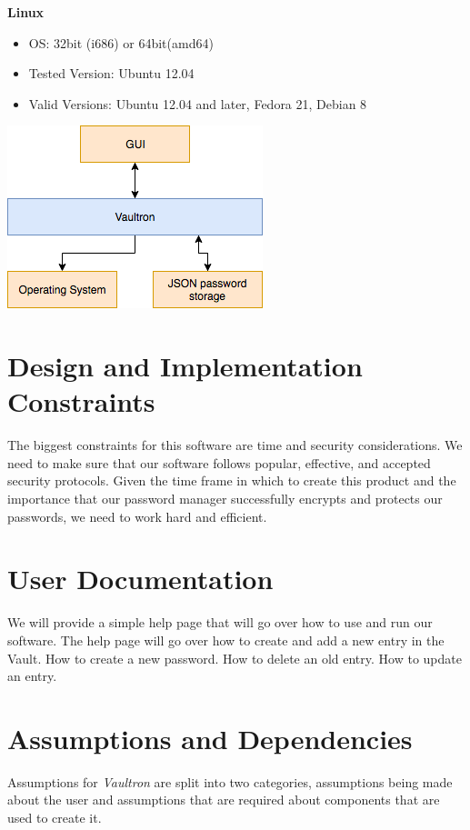 \documentclass[11pt]{report}
\newenvironment{myitemize}
{ \begin{itemize}
    \setlength{\itemsep}{0pt}
    \setlength{\parskip}{0pt}
    \setlength{\parsep}{0pt}     }
{ \end{itemize}                  }
\begin{document}
\textbf{Linux}
\begin{myitemize}
    \item OS: 32bit (i686) or 64bit(amd64)
    \item Tested Version: Ubuntu 12.04 
    \item Valid Versions: Ubuntu 12.04 and later, Fedora 21, Debian 8
\end{myitemize}

\begin{center}
\includegraphics[scale=0.77]{operating-environment.png}
\end{center}


\section{Design and Implementation Constraints}
The biggest constraints for this software are time and security considerations.
We need to make sure that our software follows popular, effective, and
accepted security protocols. Given the time frame in which to create this
product and the importance that our password manager successfully encrypts
and protects our passwords, we need to work hard and efficient.


\section{User Documentation}
We will provide a simple help page that will go over how to use and run 
our software. The help page will go over how to create and add a new entry in the 
Vault. How to create a new password. How to delete an old entry. How to update 
an entry.


\section{Assumptions and Dependencies}
Assumptions for \textit{Vaultron} are split into two categories, assumptions
being made about the user and assumptions that are required about components
that are used to create it. 
\end{document}
